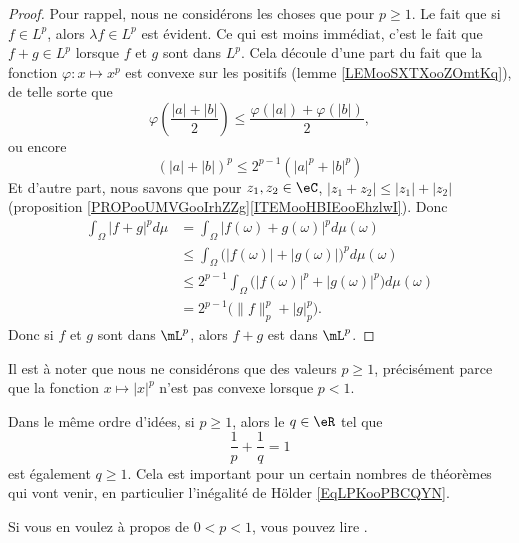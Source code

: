 \begin{proof}
	Pour rappel, nous ne considérons les choses que pour \( p\geq 1\). Le fait que si \( f\in L^p\), alors \( \lambda f\in L^p\) est évident. Ce qui est moins immédiat, c'est le fait que \( f+g\in L^p\) lorsque \( f\) et \( g\) sont dans \( L^p\). Cela découle d'une part du fait que la fonction \( \varphi\colon x\mapsto x^p\) est convexe sur les positifs (lemme \ref{LEMooSXTXooZOmtKq}), de telle sorte que
	\begin{equation}
		\varphi\left( \frac{ |a|+|b| }{2} \right)\leq\frac{ \varphi(|a|)+\varphi(|b|) }{2},
	\end{equation}
	ou encore
	\begin{equation}    \label{EqZFSduFa}
		(|a|+|b|)^p\leq 2^{p-1}(|a|^p+|b|^p)
	\end{equation}
	Et d'autre part, nous savons que pour \( z_1,z_2\in \eC\), \( | z_1+z_2 |\leq | z_1 |+| z_2 |\) (proposition \ref{PROPooUMVGooIrhZZg}\ref{ITEMooHBIEooEhzlwI}). Donc
	\begin{subequations}        \label{EQooKRMEooSLHUUc}
		\begin{align}
			\int_{\Omega}| f+g |^pd\mu & =\int_{\Omega}| f(\omega)+g(\omega) |^pd\mu(\omega)                              \\
			                           & \leq \int_{\Omega}\big( | f(\omega) |+| g(\omega) | \big)^pd\mu(\omega)          \\
			                           & \leq 2^{p-1}\int_{\Omega}\big( | f(\omega) |^p+| g(\omega) |^p \big)d\mu(\omega) \\
			                           & =2^{p-1}\big( \| f \|_p^p+| g |_p^p \big).
		\end{align}
	\end{subequations}
	Donc si \( f\) et \( g\) sont dans \( \mL^p\), alors \( f+g\) est dans \( \mL^p\).
\end{proof}

\begin{normaltext}
	Il est à noter que nous ne considérons que des valeurs \( p\geq 1\), précisément parce que la fonction \( x\mapsto | x |^p\) n'est pas convexe lorsque \( p<1\).

	Dans le même ordre d'idées, si \( p\geq 1\), alors le \( q\in \eR\) tel que
	\begin{equation}
		\frac{1}{ p }+\frac{1}{ q }=1
	\end{equation}
	est également \( q\geq 1\). Cela est important pour un certain nombres de théorèmes qui vont venir, en particulier l'inégalité de Hölder \eqref{EqLPKooPBCQYN}.

	Si vous en voulez à propos de \( 0<p<1\), vous pouvez lire \cite{ooECQXooZUqbSO}.
\end{normaltext}

